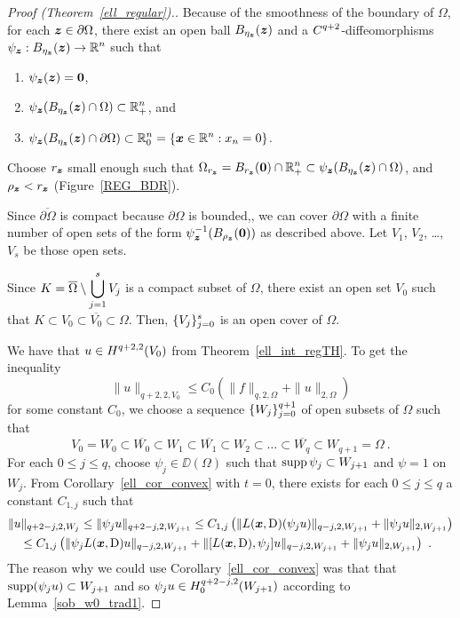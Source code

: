 \begin{proof}[Proof (Theorem~\ref{ell_regular}).]
Because of the smoothness of the boundary of $\Omega$, for
each ${\bm{z}} \in \partial \Omega$, there exist an open ball
$B_{\eta_{{\bm{z}}}}({\bm{z}})$ and a $\displaystyle C^{q+2}$-diffeomorphisms
$\displaystyle \psi_{{\bm{z}}}:B_{\eta_{{\bm{z}}}}({\bm{z}}) \rightarrow \mathbb{R}^n$
such that
\begin{enumerate}
\item $\psi_{\bm{z}}({\bm{z}})={\bm{0}}$,
\item $\displaystyle \psi_{\bm{z}}(B_{\eta_{\bm{z}}}({\bm{z}})\cap \Omega)
\subset \mathbb{R}^n_+$, and
\item $\displaystyle \psi_{\bm{z}}(B_{\eta_{\bm{z}}}({\bm{z}})\cap
\partial \Omega) \subset \mathbb{R}^n_0=\{{\bm{x}} \in \mathbb{R}^n : x_n=0 \}$.
\end{enumerate}
Choose $r_{\bm{z}}$ small enough such that
$\displaystyle \Omega_{r_{\bm{z}}} = B_{r_{{\bm{z}}}}({\bm{0}}) \cap \mathbb{R}^n_+
\subset \psi_{\bm{z}}(B_{\eta_{\bm{z}}}({\bm{z}})\cap \Omega)$,
and $\rho_{{\bm{z}}} < r_{\bm{z}}$ (Figure~\ref{REG_BDR}).

Since $\overline{\partial \Omega}$ is compact because $\partial \Omega$
is bounded,, we can cover $\partial \Omega$ with a finite
number of open sets of the form
$\displaystyle \psi_{{\bm{z}}}^{-1}(B_{\rho_{\bm{z}}}({\bm{0}}))$
as described above.  Let $V_1$, $V_2$, \ldots, $V_s$ be those open sets.

Since $\displaystyle K = \overline{\Omega} \setminus \bigcup_{j=1}^s V_j$
is a compact subset of $\Omega$, there exist an open set $V_0$ such
that $K \subset V_0 \subset \overline{V_0} \subset \Omega$.
Then, $\displaystyle \{ V_j \}_{j=0}^s$ is an open cover of $\Omega$.

We have that $\displaystyle u \in H^{q+2,2}(V_0)$ from
Theorem~\ref{ell_int_regTH}.  To get the inequality
\[
\|u\|_{q+2,2,V_0} \leq C_0 \left( \|f\|_{q,2,\Omega} + \|u\|_{2,\Omega} \right)
\]
for some constant $C_0$, we choose a sequence
$\displaystyle \{ W_j\}_{j=0}^{q+1}$ of open subsets of $\Omega$ such that
\[
V_0 = W_0 \subset \overline{W_0} \subset W_1 \subset \overline{W_1}
\subset W_2 \subset \ldots \subset \overline{W_q} \subset
W_{q+1} = \Omega \  .
\]
For each $0\leq j \leq q$, choose $\psi_j \in \DD(\Omega)$ such
that $\operatorname{supp} \psi_j \subset W_{j+1}$ and $\psi = 1$ on $W_j$.
From Corollary~\ref{ell_cor_convex} with $t=0$, there exists
for each $0\leq j \leq q$ a constant $C_{1,j}$ such that
\begin{align*}
&\| u \|_{q+2-j,2,W_j} \leq \| \psi_j u \|_{q+2-j,2,W_{j+1}}
\leq C_{1,j} \left( \|L({\bm{x}},\operatorname{D}) (\psi_j u)\|_{q-j,2,W_{j+1}} +
\|\psi_j u \|_{2,W_{j+1}} \right) \\
&\quad \leq C_{1,j} \left( \| \psi_j L({\bm{x}},\operatorname{D}) u\|_{q-j,2,W_{j+1}}
+ \| [L({\bm{x}},\operatorname{D}),\psi_j]  u \|_{q-j,2,W_{j+1}}
 + \|\psi_j u \|_{2,W_{j+1}} \right) \ .
\end{align*}
The reason why we could use Corollary~\ref{ell_cor_convex} was that
that $\operatorname{supp} (\psi_j u) \subset W_{j+1}$ and so 
$\displaystyle \psi_j u \in H^{q+2-j,2}_0(W_{j+1})$ according to
Lemma~\ref{sob_w0_trad1}.


\end{proof}
